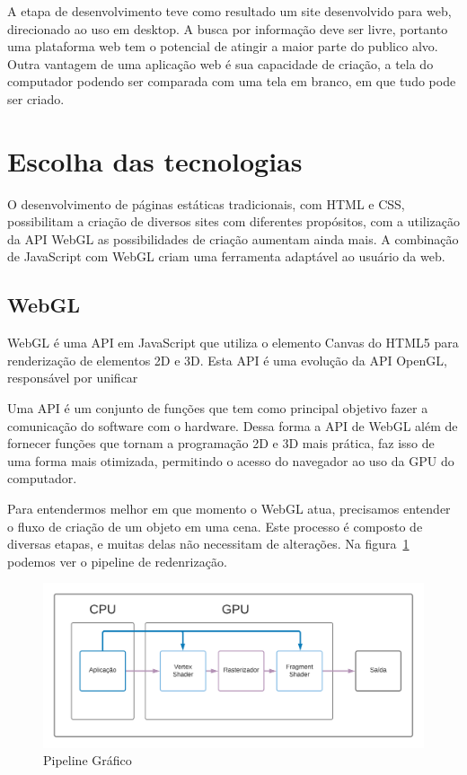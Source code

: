 \documentclass[tcc,capa]{texufpel}
\begin{document}
A etapa de desenvolvimento teve como resultado um site desenvolvido para web, direcionado ao uso em desktop. A busca por informação deve ser livre, portanto uma plataforma web tem o potencial de atingir a maior parte do publico alvo. Outra vantagem de uma aplicação web é sua capacidade de criação, a tela do computador podendo ser comparada com uma tela em branco, em que tudo pode ser criado.

\section{Escolha das tecnologias}

O desenvolvimento de páginas estáticas tradicionais, com HTML e CSS, possibilitam a criação de diversos sites com diferentes propósitos, com a utilização da API WebGL as possibilidades de criação aumentam ainda mais. A combinação de JavaScript com WebGL criam uma ferramenta adaptável ao usuário da web.

\subsection{WebGL}

WebGL é uma API em JavaScript que utiliza o elemento Canvas do HTML5 para renderização de elementos 2D e 3D. Esta API é uma evolução da API OpenGL, responsável por unificar 

Uma API é um conjunto de funções que tem como principal objetivo fazer a comunicação do software com o hardware. Dessa forma a API de WebGL além de fornecer funções que tornam a programação 2D e 3D mais prática, faz isso de uma forma mais otimizada, permitindo o acesso do navegador ao uso da GPU do computador. 

Para entendermos melhor em que momento o WebGL atua, precisamos entender o fluxo de criação de um objeto em uma cena. Este processo é composto de diversas etapas, e muitas delas não necessitam de alterações. Na figura~\ref{pipeline_grafico} podemos ver o pipeline de redenrização.

\begin{figure}[htbp]
  \centering \includegraphics[scale=.7]{pipeline_grafico}
  \caption{Pipeline Gráfico}
  \label{pipeline_grafico}
\end{figure}%
\end{document}
